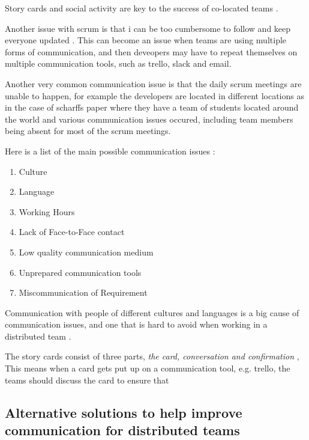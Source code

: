 \documentclass{scrartcl}
\begin{document}
 Story cards and social activity are key to the success of co-located teams \cite{abdullah2011}. \par

Another issue with scrum is that i can be too cumbersome to follow and keep everyone updated \cite{scharff2012}. This can become an issue when teams are using multiple forms of communication, and then deveopers may have to repeat themselves on multiple communication tools, such as trello, slack and email. \par

Another very common communication issue is that the daily scrum meetings are unable to happen, for example the developers are located in different locations as in the case of scharffs paper \cite{scharff2012} where they have a team of students located around the world and various communication issues occured, including team members being absent for most of the scrum meetings. 

Here is a list of the main possible communication issues \cite{joshi2013}: 

\begin{enumerate}
\item Culture
\item Language
\item Working Hours
\item Lack of Face-to-Face contact
\item Low quality communication medium
\item Unprepared communication tools
\item Miscommunication of Requirement
\end{enumerate}

Communication with people of different cultures and languages is a big cause of communication issues, and one that is hard to avoid when working in a distributed team \cite{cohn2003}.

The story cards consist of three parts, \textit{the card, conversation and confirmation} \cite{abdullah2011}, This means when a card gets put up on a communication tool, e.g. trello, the teams should discuss the card to ensure that   

\subsection{Alternative solutions to help improve communication for distributed teams}
\end{document}
